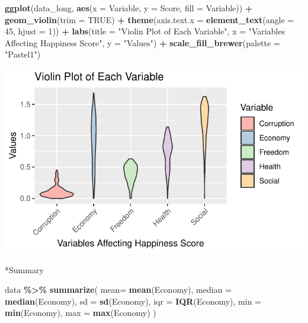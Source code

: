 \documentclass[
  11pt,
]{article}
\newenvironment{Shaded}{\begin{snugshade}}{\end{snugshade}}
\newcommand{\AttributeTok}[1]{\textcolor[rgb]{0.13,0.29,0.53}{#1}}
\newcommand{\ConstantTok}[1]{\textcolor[rgb]{0.56,0.35,0.01}{#1}}
\newcommand{\DecValTok}[1]{\textcolor[rgb]{0.00,0.00,0.81}{#1}}
\newcommand{\FunctionTok}[1]{\textcolor[rgb]{0.13,0.29,0.53}{\textbf{#1}}}
\newcommand{\NormalTok}[1]{#1}
\newcommand{\SpecialCharTok}[1]{\textcolor[rgb]{0.81,0.36,0.00}{\textbf{#1}}}
\newcommand{\StringTok}[1]{\textcolor[rgb]{0.31,0.60,0.02}{#1}}
\begin{document}
\begin{Shaded}
\begin{Highlighting}[]
\FunctionTok{ggplot}\NormalTok{(data\_long, }\FunctionTok{aes}\NormalTok{(}\AttributeTok{x =}\NormalTok{ Variable, }\AttributeTok{y =}\NormalTok{ Score, }\AttributeTok{fill =}\NormalTok{ Variable)) }\SpecialCharTok{+}
  \FunctionTok{geom\_violin}\NormalTok{(}\AttributeTok{trim =} \ConstantTok{TRUE}\NormalTok{) }\SpecialCharTok{+} 
  \FunctionTok{theme}\NormalTok{(}\AttributeTok{axis.text.x =} \FunctionTok{element\_text}\NormalTok{(}\AttributeTok{angle =} \DecValTok{45}\NormalTok{, }\AttributeTok{hjust =} \DecValTok{1}\NormalTok{)) }\SpecialCharTok{+}
  \FunctionTok{labs}\NormalTok{(}\AttributeTok{title =} \StringTok{"Violin Plot of Each Variable"}\NormalTok{,}
       \AttributeTok{x =} \StringTok{"Variables Affecting Happiness Score"}\NormalTok{, }\AttributeTok{y =} \StringTok{"Values"}\NormalTok{) }\SpecialCharTok{+}
  \FunctionTok{scale\_fill\_brewer}\NormalTok{(}\AttributeTok{palette =} \StringTok{"Pastel1"}\NormalTok{)}
\end{Highlighting}
\end{Shaded}

\begin{center}\includegraphics[width=0.7\linewidth]{Group_project_2_files/figure-latex/unnamed-chunk-21-1} \end{center}

*Summary

\begin{Shaded}
\begin{Highlighting}[]
\NormalTok{data }\SpecialCharTok{\%\textgreater{}\%}
  \FunctionTok{summarize}\NormalTok{(}
    \AttributeTok{mean=} \FunctionTok{mean}\NormalTok{(Economy),}
    \AttributeTok{median =} \FunctionTok{median}\NormalTok{(Economy),}
    \AttributeTok{sd =} \FunctionTok{sd}\NormalTok{(Economy),}
    \AttributeTok{iqr =} \FunctionTok{IQR}\NormalTok{(Economy),}
    \AttributeTok{min =} \FunctionTok{min}\NormalTok{(Economy),}
    \AttributeTok{max =} \FunctionTok{max}\NormalTok{(Economy)}
\NormalTok{ )}
\end{Highlighting}
\end{Shaded}
\end{document}
